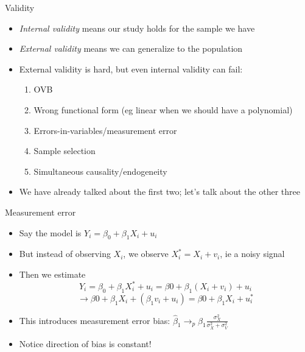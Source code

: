 \documentclass[aspectratio=169]{beamer}
\begin{document}
\begin{frame}{Validity}
    \begin{itemize}
        \item \textit{Internal validity} means our study holds for the sample we have
        \item \textit{External validity} means we can generalize to the population
        \item External validity is hard, but even internal validity can fail:
        \begin{enumerate}
            \item OVB
            \item Wrong functional form (eg linear when we should have a polynomial)
            \item Errors-in-variables/measurement error
            \item Sample selection
            \item Simultaneous causality/endogeneity
        \end{enumerate}
        \item We have already talked about the first two; let's talk about the other three
    \end{itemize}
\end{frame}

\begin{frame}{Measurement error}
    \begin{itemize}
        \item Say the model is $Y_i = \beta_0 + \beta_1 X_i + u_i$
        \item But instead of observing $X_i$, we observe $X_i^* = X_i + v_i$, ie a noisy signal
        \item Then we estimate 
        $$Y_i = \beta_0 +  \beta_1 X_i^* + u_i = \beta0 + \beta_1 (X_i + v_i) + u_i $$
        $$ \to \beta0 + \beta_1 X_i + (\beta_1 v_i + u_i)  = \beta0 + \beta_1 X_i + u_i^*$$
        \item This introduces measurement error bias: $\hat{\beta}_1 \rightarrow_p \beta_1 \frac{\sigma_X^2}{\sigma_X^2+\sigma_V^2}$
        \item Notice direction of bias is constant!
    \end{itemize}
\end{frame}
\end{document}
